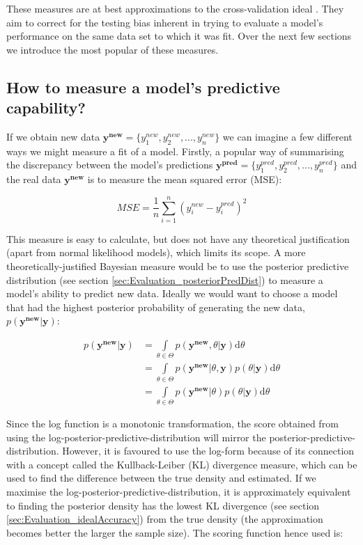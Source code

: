 \documentclass[11pt,fullpage]{book}
\begin{document}
These measures are at best approximations to the cross-validation ideal \cite{gelman2014understanding}. They aim to correct for the testing bias inherent in trying to evaluate a model's performance on the same data set to which it was fit. Over the next few sections we introduce the most popular of these measures. 

\subsection{How to measure a model's predictive capability?}
If we obtain new data $\boldsymbol{y^{new}}=\{y^{new}_1,y^{new}_2,...,y^{new}_n\}$ we can imagine a few different ways we might measure a fit of a model. Firstly, a popular way of summarising the discrepancy between the model's predictions $\boldsymbol{y^{pred}}=\{y^{pred}_1,y^{pred}_2,...,y^{pred}_n\}$ and the real data $\boldsymbol{y^{new}}$ is to measure the mean squared error (MSE):

\begin{equation}
MSE = \frac{1}{n}\sum\limits_{i=1}^{n} (y^{new}_i-y^{pred}_i)^2
\end{equation}

This measure is easy to calculate, but does not have any theoretical justification (apart from normal likelihood models), which limits its scope. A more theoretically-justified Bayesian measure would be to use the posterior predictive distribution (see section \ref{sec:Evaluation_posteriorPredDist}) to measure a model's ability to predict new data. Ideally we would want to choose a model that had the highest posterior probability of generating the new data, $p(\boldsymbol{y^{new}}|\boldsymbol{y})$:

\begin{equation}
\begin{align}
p(\boldsymbol{y^{new}}|\boldsymbol{y}) &= \int\limits_{\theta\in\Theta} p(\boldsymbol{y^{new}},\theta|\boldsymbol{y})\mathrm{d}\theta\\
&= \int\limits_{\theta\in\Theta} p(\boldsymbol{y^{new}}|\theta,\boldsymbol{y})p(\theta|\boldsymbol{y})\mathrm{d}\theta\\
&= \int\limits_{\theta\in\Theta} p(\boldsymbol{y^{new}}|\theta)p(\theta|\boldsymbol{y})\mathrm{d}\theta
\end{align}
\end{equation} 


Since the log function is a monotonic transformation, the score obtained from using the log-posterior-predictive-distribution will mirror the posterior-predictive-distribution. However, it is favoured to use the log-form because of its connection with a concept called the Kullback-Leiber (KL) divergence measure, which can be used to find the difference between the true density and estimated. If we maximise the log-posterior-predictive-distribution, it is approximately equivalent to finding the posterior density has the lowest KL divergence (see section \ref{sec:Evaluation_idealAccuracy}) from the true density (the approximation becomes better the larger the sample size). The scoring function hence used is: 
\end{document}
